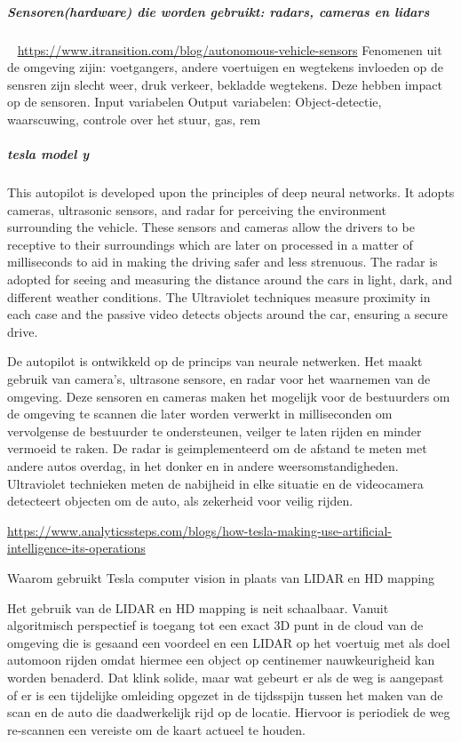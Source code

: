 \documentclass{article}
\begin{document}
\subparagraph{Sensoren(hardware) die worden gebruikt: radars, cameras en lidars}
~\cite{itransition}
\url{https://www.itransition.com/blog/autonomous-vehicle-sensors}
Fenomenen uit de omgeving zijin: voetgangers, andere voertuigen en wegtekens
invloeden op de sensren zijn slecht weer, druk verkeer, bekladde wegtekens. Deze hebben impact op de sensoren.
Input variabelen
Output variabelen: Object-detectie, waarscuwing, controle over het stuur, gas, rem




\subparagraph{tesla model y}
This autopilot is developed upon the principles of deep neural networks. It adopts cameras, ultrasonic sensors, and radar for perceiving the environment surrounding the vehicle.  These sensors and cameras allow the drivers to be receptive to their surroundings which are later on processed in a matter of milliseconds to aid in making the driving safer and less strenuous. The radar is adopted for seeing and measuring the distance around the cars in light, dark, and different weather conditions. The Ultraviolet techniques measure proximity in each case and the passive video detects objects around the car, ensuring a secure drive.

De autopilot is ontwikkeld op de princips van neurale netwerken. Het maakt gebruik van camera's, ultrasone sensore, en radar voor het waarnemen van de omgeving. Deze sensoren en cameras maken het mogelijk voor de bestuurders om de omgeving te scannen die later worden verwerkt in  milliseconden om vervolgense de bestuurder te ondersteunen, veilger te laten rijden en minder vermoeid te  raken. De radar is geimplementeerd om de afstand te meten met andere autos overdag, in het donker en in andere weersomstandigheden. Ultraviolet technieken meten de nabijheid in elke situatie en de videocamera detecteert objecten om de auto, als zekerheid  voor veilig rijden.

\url{https://www.analyticssteps.com/blogs/how-tesla-making-use-artificial-intelligence-its-operations}

Waarom gebruikt Tesla computer vision in plaats van LIDAR en HD mapping

Het gebruik van de LIDAR en HD mapping is neit schaalbaar.
Vanuit algoritmisch perspectief is toegang tot een exact 3D punt in de cloud van de omgeving die is gesaand een voordeel en een  LIDAR  op het voertuig met als  doel automoon rijden omdat hiermee een object op centinemer nauwkeurigheid kan worden benaderd. Dat klink solide, maar wat gebeurt er als de weg is aangepast of er is een tijdelijke omleiding opgezet in de tijdsspijn tussen het maken van de scan en de auto die daadwerkelijk rijd op de locatie. Hiervoor is periodiek de weg re-scannen een vereiste om de kaart actueel te houden.
\end{document}
